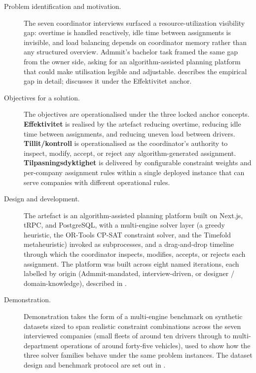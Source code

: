 \begin{description}
  \item[Problem identification and motivation.] The seven coordinator interviews surfaced a resource-utilization visibility gap: overtime is handled reactively, idle time between assignments is invisible, and load balancing depends on coordinator memory rather than any structured overview. Admmit's bachelor task framed the same gap from the owner side, asking for an algorithm-assisted planning platform that could make utilisation legible and adjustable.  describes the empirical gap in detail;  discusses it under the Effektivitet anchor.
  \item[Objectives for a solution.] The objectives are operationalised under the three locked anchor concepts. \textbf{Effektivitet} is realised by the artefact reducing overtime, reducing idle time between assignments, and reducing uneven load between drivers. \textbf{Tillit/kontroll} is operationalised as the coordinator's authority to inspect, modify, accept, or reject any algorithm-generated assignment. \textbf{Tilpasningsdyktighet} is delivered by configurable constraint weights and per-company assignment rules within a single deployed instance that can serve companies with different operational rules.
  \item[Design and development.] The artefact is an algorithm-assisted planning platform built on Next.js, tRPC, and PostgreSQL, with a multi-engine solver layer (a greedy heuristic, the OR-Tools CP-SAT constraint solver, and the Timefold metaheuristic) invoked as subprocesses, and a drag-and-drop timeline through which the coordinator inspects, modifies, accepts, or rejects each assignment. The platform was built across eight named iterations, each labelled by origin (Admmit-mandated, interview-driven, or designer / domain-knowledge), described in .
  \item[Demonstration.] Demonstration takes the form of a multi-engine benchmark on synthetic datasets sized to span realistic constraint combinations across the seven interviewed companies (small fleets of around ten drivers through to multi-department operations of around forty-five vehicles), used to show how the three solver families behave under the same problem instances. The dataset design and benchmark protocol are set out in .

\end{description}
